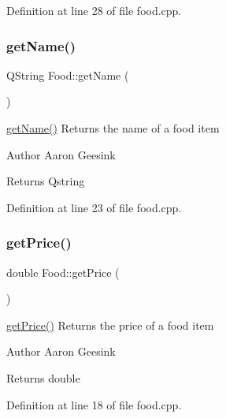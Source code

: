 Definition at line 28 of file food.\+cpp.

\mbox{\label{class_food_a5652293c23e8b797d363c08efc585601}} 
\subsubsection{\texorpdfstring{getName()}{getName()}}
{\footnotesize\ttfamily Q\+String Food\+::get\+Name (\begin{DoxyParamCaption}{ }\end{DoxyParamCaption})}



\mbox{\hyperlink{class_food_a5652293c23e8b797d363c08efc585601}{get\+Name()}} Returns the name of a food item 

\begin{DoxyAuthor}{Author}
Aaron Geesink 
\end{DoxyAuthor}
\begin{DoxyReturn}{Returns}
Qstring 
\end{DoxyReturn}


Definition at line 23 of file food.\+cpp.

\mbox{\label{class_food_a16683d009125620dd07432fbe7711597}} 
\subsubsection{\texorpdfstring{getPrice()}{getPrice()}}
{\footnotesize\ttfamily double Food\+::get\+Price (\begin{DoxyParamCaption}{ }\end{DoxyParamCaption})}



\mbox{\hyperlink{class_food_a16683d009125620dd07432fbe7711597}{get\+Price()}} Returns the price of a food item 

\begin{DoxyAuthor}{Author}
Aaron Geesink 
\end{DoxyAuthor}
\begin{DoxyReturn}{Returns}
double 
\end{DoxyReturn}


Definition at line 18 of file food.\+cpp.

\mbox{\label{class_food_abe2267ba02f1b812c71028f427d92d81}} 
